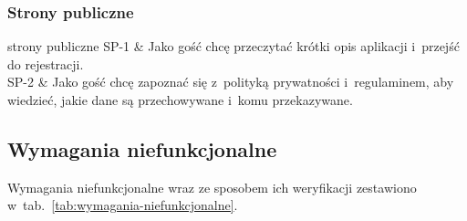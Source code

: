 \subsubsection{Strony publiczne}

\begin{historyjki}{strony publiczne}
  SP-1 & Jako gość chcę przeczytać krótki opis aplikacji i~przejść do rejestracji. \\
  SP-2 & Jako gość chcę zapoznać się z~polityką prywatności i~regulaminem, aby wiedzieć, jakie dane są przechowywane i~komu przekazywane. \\
\end{historyjki}

\subsection{Wymagania niefunkcjonalne}

Wymagania niefunkcjonalne wraz ze sposobem ich weryfikacji zestawiono w~tab.~\ref{tab:wymagania-niefunkcjonalne}.

